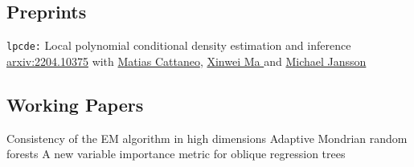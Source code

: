 \documentclass[10pt,a4paper,roman]{moderncv}        %
\begin{document}
\subsection{Preprints}
\cventry{}
{\vspace{-0.4cm}}
{\texttt{lpcde:} Local polynomial conditional density estimation and inference}
{\color{blue}\href{https://arxiv.org/abs/2204.10375}{arxiv:2204.10375}\color{black}}{}
{with \color{blue}\href{https://cattaneo.princeton.edu}{Matias Cattaneo}\color{black},
  \color{blue}\href{https://sites.google.com/view/xinweima/home?authuser=0}{Xinwei
    Ma }\color{black}
  and
  \color{blue}\href{https://sites.google.com/berkeley.edu/michael-jansson/}{Michael
    Jansson}\color{black}
  }
\subsection{Working Papers}
{Consistency of the EM algorithm in high dimensions} {}{}{}
{Adaptive Mondrian random forests} {}{}{}
{A new variable importance metric for oblique regression trees} {}{}{}

\vspace{-0.3cm}
\end{document}
